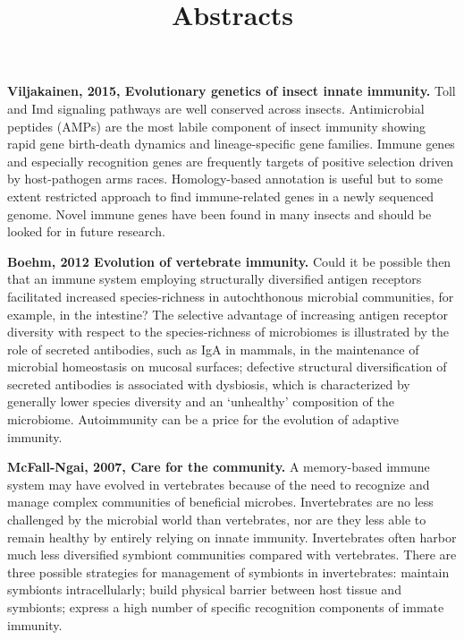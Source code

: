 \documentclass[11pt]{article}
\title{Abstracts}
\author{}
\date{}
\begin{document}
\begin{sloppypar}
  \maketitle

  \linenumbers

\textbf{Viljakainen, 2015, Evolutionary genetics of insect innate immunity.} \newline
Toll and Imd signaling pathways are well conserved across insects. 
Antimicrobial peptides (AMPs) are the most labile component of insect immunity showing rapid gene birth-death dynamics and lineage-specific gene families. 
Immune genes and especially recognition genes are frequently targets of positive selection driven by host-pathogen arms races. 
Homology-based annotation is useful but to some extent restricted approach to find immune-related genes in a newly sequenced genome. 
Novel immune genes have been found in many insects and should be looked for in future research.

\par

\textbf{Boehm, 2012 Evolution of vertebrate immunity.} \newline
Could it be possible then that an immune system employing structurally diversified antigen receptors facilitated increased species-richness in autochthonous microbial communities, for example, in the intestine? 
The selective advantage of increasing antigen receptor diversity with respect to the species-richness of microbiomes is illustrated by the role of secreted antibodies, such as IgA in mammals, in the maintenance of microbial homeostasis on mucosal surfaces; defective structural diversification of secreted antibodies is associated with dysbiosis, which is characterized by generally lower species diversity and an ‘unhealthy’ composition of the microbiome. 
Autoimmunity can be a price for the evolution of adaptive immunity. 

\par

\textbf{McFall-Ngai, 2007, Care for the community.} \newline
A memory-based immune system may have evolved in vertebrates because of the need to recognize and manage complex communities of beneficial microbes. 
Invertebrates are no less challenged by the microbial world than vertebrates, nor are they less able to remain healthy by entirely relying on innate immunity. 
Invertebrates often harbor much less diversified symbiont communities compared with vertebrates. 
There are three possible strategies for management of symbionts in invertebrates: 
maintain symbionts intracellularly; 
build physical barrier between host tissue and symbionts; 
express a high number of specific recognition components of immate immunity. 


\end{sloppypar}
\end{document}

